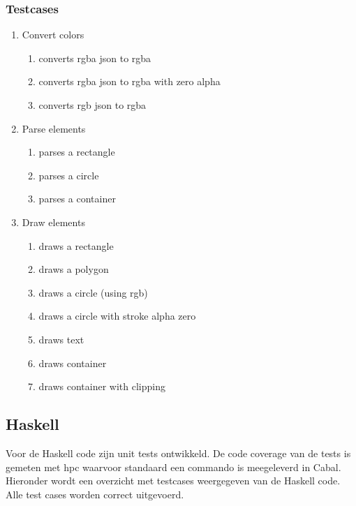 \subsubsection{Testcases}
\begin{enumerate}[label={T\arabic*}]
	\item Convert colors
	\begin{enumerate}[label={T\arabic{enumi}.\arabic*}]
		\item \label{test:js:convert:rgbajson:rgba} converts rgba json to rgba
		\item \label{test:js:convert:rgbajson:rgba:alphazero} converts rgba json to rgba with zero alpha
		\item \label{test:js:convert:rgbjson:rgba} converts rgb json to rgba
	\end{enumerate}
	\item Parse elements
	\begin{enumerate}[label={T\arabic{enumi}.\arabic*}]
		\item \label{test:js:parse:rect} parses a rectangle
		\item \label{test:js:parse:circle} parses a circle
		\item \label{test:js:parse:container} parses a container
	\end{enumerate}
	\item Draw elements
	\begin{enumerate}[label={T\arabic{enumi}.\arabic*}]
		\item \label{test:js:draw:rect} draws a rectangle
		\item \label{test:js:draw:polygon} draws a polygon
		\item \label{test:js:draw:circle} draws a circle (using rgb)
		\item \label{test:js:draw:circle:alpha} draws a circle with stroke alpha zero
		\item \label{test:js:draw:text} draws text
		\item \label{test:js:draw:container} draws container
		\item \label{test:js:draw:container:clipping} draws container with clipping
	\end{enumerate}
	\setcounter{startvaluetest}{\value{enumi}}
\end{enumerate}

\subsection{Haskell}
Voor de Haskell code zijn unit tests ontwikkeld. De code coverage van de tests is gemeten met hpc waarvoor standaard een commando is meegeleverd in Cabal. Hieronder wordt een overzicht met testcases weergegeven van de Haskell code. Alle test cases worden correct uitgevoerd.


